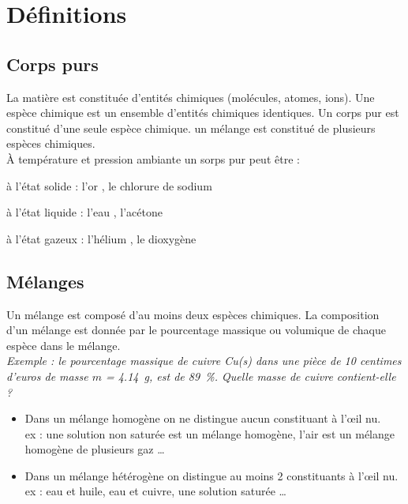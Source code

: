 \documentclass[a4paper,11pt,fleqn]{article}%
\begin{document}
\maketitle

\section{Définitions}
	\subsection{Corps purs}
La matière est constituée d'entités chimiques (molécules, atomes, ions). Une espèce chimique est un ensemble d'entités chimiques identiques. Un corps pur est constitué d'une seule espèce chimique. un mélange est constitué de plusieurs espèces chimiques.\\
À température et pression ambiante un sorps pur peut être :
\begin{itemize*}
	\item à l'état solide : l'or , le chlorure de sodium 
	\item à l'état liquide : l'eau , l'acétone 
	\item à l'état gazeux : l'hélium , le dioxygène 
\end{itemize*}

	\subsection{Mélanges}
Un mélange est composé d’au moins deux espèces chimiques. La composition d’un mélange est
donnée par le pourcentage massique ou volumique de chaque espèce dans le mélange.\\

\textit{Exemple : le pourcentage massique de cuivre Cu(s) dans une pièce de 10 centimes d’euros de
masse $m$ = \SI{4,14}{g}, est de \SI{89}{\percent}. Quelle masse de cuivre contient-elle ?}

\begin{itemize}
	\item Dans un mélange homogène on ne distingue aucun constituant à l’œil nu.\\
ex : une solution non saturée est un mélange homogène, l’air est un mélange homogène de
plusieurs gaz …
	\item Dans un mélange hétérogène on distingue au moins 2 constituants à l’œil nu.\\
ex : eau et huile, eau et cuivre, une solution saturée …
\end{itemize}
\end{document}
